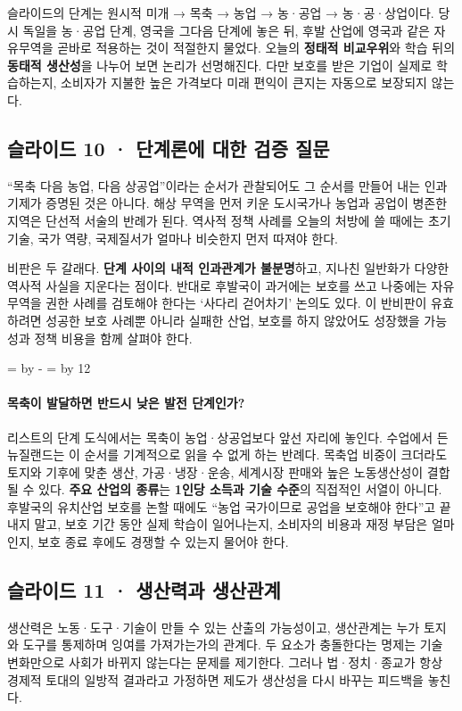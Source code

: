 \documentclass[10pt,a4paper]{article}
\newcommand{\ReserveQuestionSpace}{%
  \par\begingroup
  \dimen0=\pagegoal \advance\dimen0 by -\pagetotal
  \dimen2=\baselineskip \multiply\dimen2 by 12
  \ifdim\dimen0<\dimen2 \newpage\fi
  \endgroup}
\begin{document}
슬라이드의 단계는 원시적 미개 → 목축 → 농업 → 농·공업 → 농·공·상업이다. 당시 독일을 농·공업 단계, 영국을 그다음 단계에 놓은 뒤, 후발 산업에 영국과 같은 자유무역을 곧바로 적용하는 것이 적절한지 물었다. 오늘의 \textbf{정태적 비교우위}와 학습 뒤의 \textbf{동태적 생산성}을 나누어 보면 논리가 선명해진다. 다만 보호를 받은 기업이 실제로 학습하는지, 소비자가 지불한 높은 가격보다 미래 편익이 큰지는 자동으로 보장되지 않는다.\par

\subsection{슬라이드 10 · 단계론에 대한 검증 질문}
“목축 다음 농업, 다음 상공업”이라는 순서가 관찰되어도 그 순서를 만들어 내는 인과 기제가 증명된 것은 아니다. 해상 무역을 먼저 키운 도시국가나 농업과 공업이 병존한 지역은 단선적 서술의 반례가 된다. 역사적 정책 사례를 오늘의 처방에 쓸 때에는 초기 기술, 국가 역량, 국제질서가 얼마나 비슷한지 먼저 따져야 한다.\par

비판은 두 갈래다. \textbf{단계 사이의 내적 인과관계가 불분명}하고, 지나친 일반화가 다양한 역사적 사실을 지운다는 점이다. 반대로 후발국이 과거에는 보호를 쓰고 나중에는 자유무역을 권한 사례를 검토해야 한다는 ‘사다리 걷어차기’ 논의도 있다. 이 반비판이 유효하려면 성공한 보호 사례뿐 아니라 실패한 산업, 보호를 하지 않았어도 성장했을 가능성과 정책 비용을 함께 살펴야 한다.\par

\ReserveQuestionSpace
\paragraph{목축이 발달하면 반드시 낮은 발전 단계인가?}

리스트의 단계 도식에서는 목축이 농업·상공업보다 앞선 자리에 놓인다. 수업에서 든 뉴질랜드는 이 순서를 기계적으로 읽을 수 없게 하는 반례다. 목축업 비중이 크더라도 토지와 기후에 맞춘 생산, 가공·냉장·운송, 세계시장 판매와 높은 노동생산성이 결합될 수 있다. \textbf{주요 산업의 종류}는 \textbf{1인당 소득과 기술 수준}의 직접적인 서열이 아니다. 후발국의 유치산업 보호를 논할 때에도 “농업 국가이므로 공업을 보호해야 한다”고 끝내지 말고, 보호 기간 동안 실제 학습이 일어나는지, 소비자의 비용과 재정 부담은 얼마인지, 보호 종료 후에도 경쟁할 수 있는지 물어야 한다.\par

\subsection{슬라이드 11 · 생산력과 생산관계}
생산력은 노동·도구·기술이 만들 수 있는 산출의 가능성이고, 생산관계는 누가 토지와 도구를 통제하며 잉여를 가져가는가의 관계다. 두 요소가 충돌한다는 명제는 기술 변화만으로 사회가 바뀌지 않는다는 문제를 제기한다. 그러나 법·정치·종교가 항상 경제적 토대의 일방적 결과라고 가정하면 제도가 생산성을 다시 바꾸는 피드백을 놓친다.\par
\end{document}
